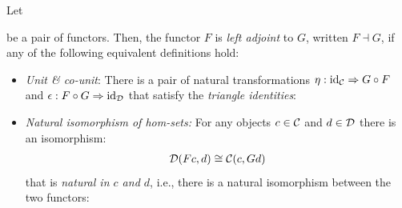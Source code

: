 \begin{fullwidth}
   \begin{definition}[Adjunction]
    Let %
    be a pair of functors. Then, the functor $F$ is \emph{left adjoint} to $G$, written $F \dashv G$, 
    if any of the following equivalent definitions hold:
    \begin{itemize}
      \item \emph{Unit \& co-unit}: There is a pair of natural transformations $\eta : \operatorname{id}_\mathcal C \Rightarrow G \circ F$ 
      and $\epsilon : F \circ G \Rightarrow \operatorname{id}_\mathcal D$ that satisfy the \emph{triangle identities}:
      \begin{center}
  \qquad
      \end{center}
      \item \emph{Natural isomorphism of hom-sets:} For any objects $c \in \mathcal C$ and $d \in \mathcal D$
      there is an isomorphism:
      \begin{align*}
        \mathcal D(Fc, d) \cong \mathcal C(c, Gd)
      \end{align*}
      that is \emph{natural in $c$ and $d$}, i.e., there is a natural isomorphism 
      between the two functors:
      

\end{itemize}
\end{definition}
\end{fullwidth}
